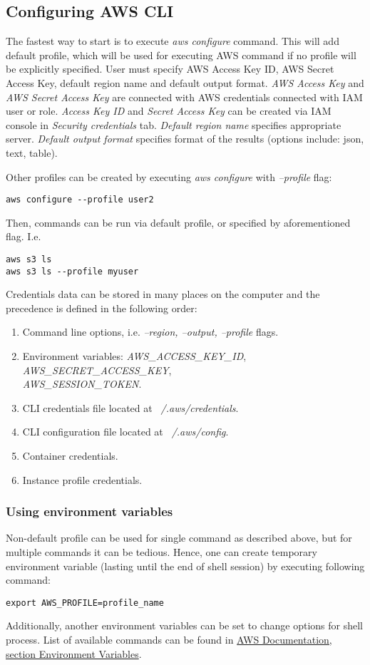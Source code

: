 \documentclass[11pt,english]{article}
\begin{document}
\subsection{Configuring AWS CLI}
The fastest way to start is to execute \textit{aws configure} command. This will add default profile, which will be used for executing AWS command if no profile will be explicitly specified. User must specify AWS Access Key ID, AWS Secret Access Key, default region name and default output format. \textit{AWS Access Key} and \textit{AWS Secret Access Key} are connected with AWS credentials connected with IAM user or role. \textit{Access Key ID} and \textit{Secret Access Key} can be created via IAM console in \textit{Security credentials} tab. \textit{Default region name} specifies appropriate server. \textit{Default output format} specifies format of the results (options include: json, text, table).

Other profiles can be created by executing \textit{aws configure} with \textit{--profile} flag:
\begin{lstlisting}
aws configure --profile user2
\end{lstlisting}
Then, commands can be run via default profile, or specified by aforementioned flag. I.e.
\begin{lstlisting}
aws s3 ls
aws s3 ls --profile myuser
\end{lstlisting}

Credentials data can be stored in many places on the computer and the precedence is defined in the following order:
\begin{enumerate}
	\item Command line options, i.e. \textit{--region, --output, --profile} flags.
	\item Environment variables: \textit{AWS\_ACCESS\_KEY\_ID}, \textit{AWS\_SECRET\_ACCESS\_KEY},\\
	\textit{AWS\_SESSION\_TOKEN}.
	\item CLI credentials file located at \textit{~/.aws/credentials}.
	\item CLI configuration file located at \textit{~/.aws/config}.
	\item Container credentials.
	\item Instance profile credentials.
\end{enumerate}

\subsubsection*{Using environment variables}
Non-default profile can be used for single command as described above, but for multiple commands it can be tedious. Hence, one can create temporary environment variable (lasting until the end of shell session) by executing following command:
\begin{lstlisting}
export AWS_PROFILE=profile_name
\end{lstlisting}
Additionally, another environment variables can be set to change options for shell process. List of available commands can be found in \href{https://docs.aws.amazon.com/cli/latest/userguide/cli-configure-envvars.html}{AWS Documentation, section Environment Variables}.
\end{document}

